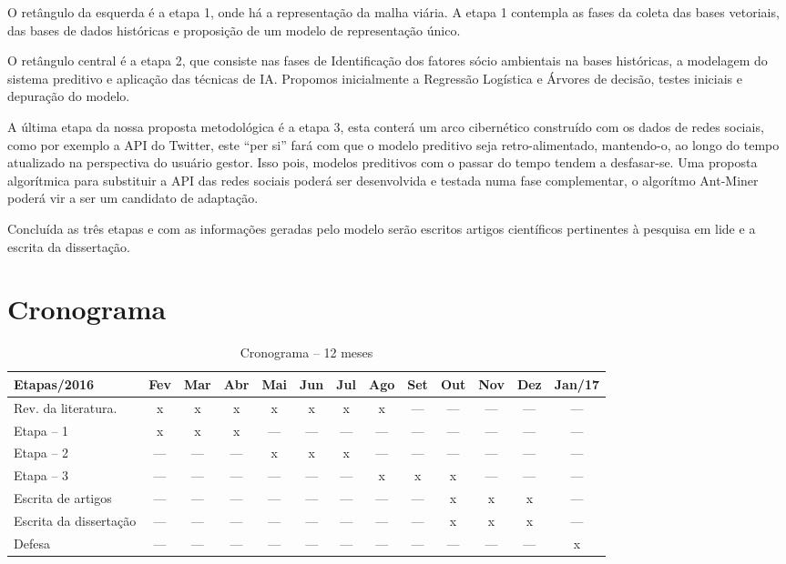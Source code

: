  

 \pagebreak
 O retângulo da esquerda é a etapa 1, onde há a representação da malha viária.
 A etapa 1 contempla as fases da coleta das bases vetoriais, das bases de dados históricas e proposição de um modelo de representação único.
 
 O retângulo central é a etapa 2, que consiste nas fases de Identificação dos fatores sócio ambientais na bases históricas, a modelagem do sistema preditivo e aplicação das técnicas de IA. Propomos inicialmente a Regressão Logística e Árvores de decisão, testes iniciais e depuração do modelo.
 
 A última etapa da nossa proposta metodológica é a etapa 3, esta conterá um arco cibernético construído com os dados de redes sociais, como por exemplo a API do Twitter, este ``per si'' fará com que o modelo preditivo seja retro-alimentado, 
 mantendo-o, ao longo do tempo atualizado na perspectiva do usuário gestor. Isso pois, modelos preditivos com o passar do tempo tendem a desfasar-se. Uma proposta algorítmica para substituir a API das redes sociais 
 poderá ser desenvolvida e testada numa fase complementar, o algorítmo Ant-Miner poderá vir a ser um candidato de adaptação.
 
 Concluída as três etapas e com as informações geradas pelo modelo serão escritos artigos científicos  pertinentes à pesquisa em lide e a escrita da dissertação.
 
 
 
 
\section{Cronograma}\label{intro:cronograma}


\begin{table}[htbp]
 \scriptsize
      \centering  \caption{Cronograma -- 12 meses}
	\begin{tabular}{l|c|c|c|c|c|c|c|c|c|c|c|c}
	\hline
	\textbf{Etapas/2016} & \textbf{Fev} & \textbf{Mar} & \textbf{Abr} & \textbf{Mai}& \textbf{Jun} & \textbf{Jul} & \textbf{Ago} & \textbf{Set} & \textbf{Out} & \textbf{Nov} & \textbf{Dez} & \textbf{Jan/17} \\
	  \hline
	  Rev. da literatura. & x & x & x & x & x & x & x & --- & --- & --- & --- & --- \\ \hline
	  Etapa -- 1 & x & x & x & --- & --- & --- & --- & --- & --- & --- & --- & --- \\ \hline
	  Etapa -- 2 & --- & --- & --- & x & x & x & --- & --- & --- & --- & --- & --- \\ \hline
	  Etapa -- 3 & --- & --- & --- & --- & --- & --- & x & x & x & --- & --- & --- \\ \hline
	  Escrita de artigos & --- & --- & --- & --- & --- & --- & --- & --- & x & x & x & --- \\ \hline
	  Escrita da dissertação & --- & --- & --- & --- & --- & --- & --- & --- & x & x & x & --- \\ \hline
	  Defesa & --- & --- & --- & --- & --- & --- & --- & --- & --- & --- & --- & x \\ \hline
	\end{tabular}
\end{table}


 




